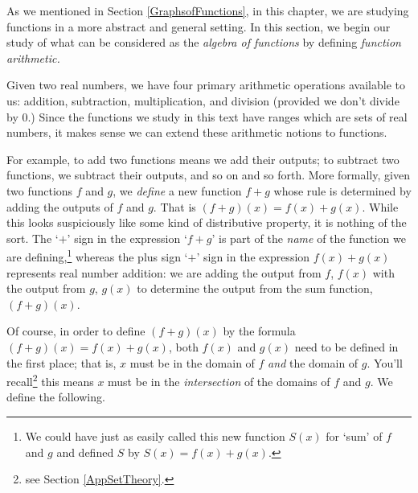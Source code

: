 \documentclass{ximera}
\begin{document}
	\author{Stitz-Zeager}




\setcounter{footnote}{0}

\label{FunctionArithmetic}

As we mentioned in Section \ref{GraphsofFunctions}, in this chapter, we are studying functions in a more abstract and general setting.  In this section, we begin our study of what can be considered as the \textit{algebra of functions}  by defining \textit{function arithmetic.}  


Given two real numbers,  we have four primary arithmetic operations available to us:  addition, subtraction, multiplication, and division (provided we don't divide by $0$.)  Since the functions we study in this text have ranges which are sets of real numbers, it makes sense we can extend these arithmetic notions to functions. 


For example,  to add two functions means  we add their outputs;  to subtract two functions, we subtract their outputs, and so on and so forth.  More formally, given two functions $f$ and $g$, we \textit{define} a new function $f+g$ whose rule is determined by adding the outputs of $f$ and $g$.  That is $(f+g)(x) = f(x) + g(x)$.  While  this looks suspiciously like some kind of distributive property, it is nothing of the sort.  The `$+$' sign in the expression `$f+g$' is part of the \textit{name} of the function we are defining,\footnote{We could have just as easily called this new function $S(x)$ for `sum' of $f$ and $g$ and defined $S$ by $S(x) = f(x) + g(x)$.} whereas the plus sign `$+$' sign in the expression $f(x) + g(x)$ represents real number addition: we are adding the output from $f$, $f(x)$ with the output from $g$, $g(x)$ to determine the output from the sum function, $(f+g)(x)$.


 Of course, in order to define $(f+g)(x)$ by the formula $(f+g)(x) = f(x) + g(x)$, both $f(x)$ and $g(x)$ need to be defined in the first place; that is, $x$ must be in the domain of $f$ \textit{and} the domain of $g$.  You'll recall\footnote{see Section \ref{AppSetTheory}.} this means $x$ must be in the \textit{intersection} of the domains of $f$ and $g$.   We define the following.
 

\end{document}
